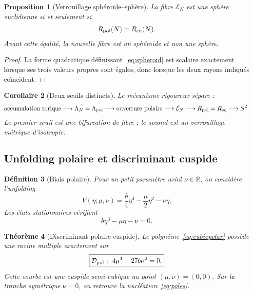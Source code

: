 \documentclass[11pt,a4paper]{article}
\newtheorem{theorem}{Théorème}[section]
\newtheorem{proposition}[theorem]{Proposition}
\newtheorem{corollary}[theorem]{Corollaire}
\newtheorem{definition}[theorem]{Définition}
\newcommand{\R}{\mathbb R}
\begin{document}
\begin{proposition}[Verrouillage sphéroïde--sphère]\label{prop:spheroid-sphere}
La fibre $\mathcal E_N$ est une sphère euclidienne si et seulement si
\begin{equation}\label{eq:isotropy-lock}
 R_{\rm pol}(N)=R_{\rm eq}(N).
\end{equation}
Avant cette égalité, la nouvelle fibre est un sphéroïde et non une sphère.
\end{proposition}

\begin{proof}
La forme quadratique définissant~\eqref{eq:spheroid} est scalaire exactement lorsque ses trois valeurs propres sont égales, donc lorsque les deux rayons indiqués coïncident.
\end{proof}

\begin{corollary}[Deux seuils distincts]
Le mécanisme rigoureux sépare :
\[
 \text{accumulation torique}
 \longrightarrow \Lambda_N=\Lambda_{\rm pol}
 \longrightarrow \text{ouverture polaire}
 \longrightarrow \mathcal E_N
 \longrightarrow R_{\rm pol}=R_{\rm eq}
 \longrightarrow S^2.
\]
Le premier seuil est une bifurcation de fibre ; le second est un verrouillage métrique d'isotropie.
\end{corollary}

\subsection{Unfolding polaire et discriminant cuspide}

\begin{definition}[Biais polaire]
Pour un petit paramètre axial $\nu\in\R$, on considère l'unfolding
\begin{equation}\label{eq:Vunfold}
 V(\eta;\mu,\nu)=\frac b4\eta^4-\frac\mu2\eta^2-\nu\eta.
\end{equation}
Les états stationnaires vérifient
\begin{equation}\label{eq:cubicpolar}
 b\eta^3-\mu\eta-\nu=0.
\end{equation}
\end{definition}

\begin{theorem}[Discriminant polaire cuspide]\label{thm:polar-cusp}
Le polynôme~\eqref{eq:cubicpolar} possède une racine multiple exactement sur
\begin{equation}\label{eq:polar-discriminant}
 \boxed{\mathcal D_{\rm pol}:\ 4\mu^3-27b\nu^2=0.}
\end{equation}
Cette courbe est une cuspide semi-cubique au point $(\mu,\nu)=(0,0)$. Sur la tranche symétrique $\nu=0$, on retrouve la nucléation~\eqref{eq:poles}.
\end{theorem}
\end{document}
